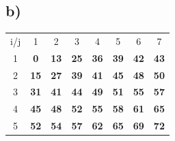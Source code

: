 \documentclass[11pt]{article} %
\begin{document}
\subsection*{b)}
\begin{table}[h]
\centering
\begin{tabular}{cccccccc}
i/j                    & 1                                                        & 2                                                        & 3                                                        & 4                                & 5                                & 6                                                        & 7                                                        \\ \cline{2-8} 
\multicolumn{1}{c|}{1} & \multicolumn{1}{c|}{\cellcolor[HTML]{F8FF00}\textbf{0}}  & \multicolumn{1}{c|}{\cellcolor[HTML]{F8FF00}\textbf{13}} & \multicolumn{1}{c|}{\cellcolor[HTML]{F8FF00}\textbf{25}} & \multicolumn{1}{c|}{\textbf{36}} & \multicolumn{1}{c|}{\textbf{39}} & \multicolumn{1}{c|}{\textbf{42}}                         & \multicolumn{1}{c|}{\textbf{43}}                         \\ \cline{2-8} 
\multicolumn{1}{c|}{2} & \multicolumn{1}{c|}{\cellcolor[HTML]{F8FF00}\textbf{15}} & \multicolumn{1}{c|}{\cellcolor[HTML]{F8FF00}\textbf{27}} & \multicolumn{1}{c|}{\textbf{39}}                         & \multicolumn{1}{c|}{\textbf{41}} & \multicolumn{1}{c|}{\textbf{45}} & \multicolumn{1}{c|}{\textbf{48}}                         & \multicolumn{1}{c|}{\textbf{50}}                         \\ \cline{2-8} 
\multicolumn{1}{c|}{3} & \multicolumn{1}{c|}{\cellcolor[HTML]{F8FF00}\textbf{31}} & \multicolumn{1}{c|}{\textbf{41}}                         & \multicolumn{1}{c|}{\textbf{44}}                         & \multicolumn{1}{c|}{\textbf{49}} & \multicolumn{1}{c|}{\textbf{51}} & \multicolumn{1}{c|}{\textbf{55}}                         & \multicolumn{1}{c|}{\textbf{57}}                         \\ \cline{2-8} 
\multicolumn{1}{c|}{4} & \multicolumn{1}{c|}{\textbf{45}}                         & \multicolumn{1}{c|}{\textbf{48}}                         & \multicolumn{1}{c|}{\textbf{52}}                         & \multicolumn{1}{c|}{\textbf{55}} & \multicolumn{1}{c|}{\textbf{58}} & \multicolumn{1}{c|}{\textbf{61}}                         & \multicolumn{1}{c|}{\textbf{65}}                         \\ \cline{2-8} 
\multicolumn{1}{c|}{5} & \multicolumn{1}{c|}{\textbf{52}}                         & \multicolumn{1}{c|}{\textbf{54}}                         & \multicolumn{1}{c|}{\textbf{57}}                         & \multicolumn{1}{c|}{\textbf{62}} & \multicolumn{1}{c|}{\textbf{65}} & \multicolumn{1}{c|}{\textbf{69}}                         & \multicolumn{1}{c|}{\textbf{72}}                         \\ \cline{2-8} 

\end{tabular}
\end{table}
\end{document}
